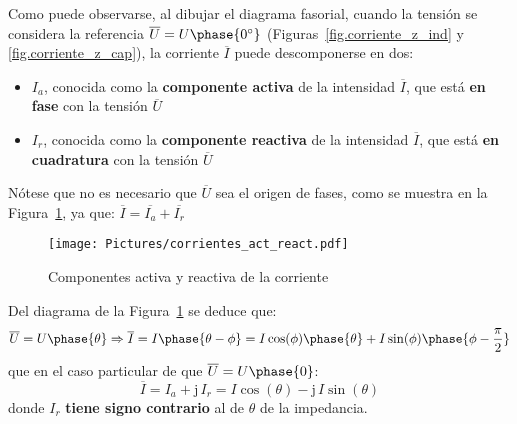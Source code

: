 \documentclass[11pt]{book} %
\numberwithin{dummy}{section}
\theoremstyle{ocrenumbox}
\theoremstyle{blacknumex}
\theoremstyle{blacknumbox}
\theoremstyle{ocrenum}
\newenvironment{remark}{\par\vspace{10pt}\small %
\begin{list}{}{
\leftmargin=35pt %
\rightmargin=25pt}\item\ignorespaces %
\makebox[-2.5pt]{\begin{tikzpicture}[overlay]
\node[draw=ocre!60,line width=1pt,circle,fill=ocre!25,font=\sffamily\bfseries,inner sep=2pt,outer sep=0pt] at (-15pt,0pt){\textcolor{ocre}{N}};\end{tikzpicture}} %
\advance\baselineskip -1pt}{\end{list}\vskip5pt} %
\newlength\esp
\begin{document}
	Como puede observarse, al dibujar el diagrama fasorial, cuando la tensión se considera la referencia $\overline{U}=U\phase{0^\circ}$ (Figuras~\ref{fig.corriente_z_ind} y \ref{fig.corriente_z_cap}), la corriente $\overline{I}$ puede descomponerse en dos:
	\begin{itemize}
		\item $I_a$, conocida como la  \textbf{componente activa} de la intensidad $\overline{I}$, que está \textbf{en fase} con la tensión $\overline{U}$
		\item $I_r$, conocida como la \textbf{componente reactiva} de la intensidad $\overline{I}$, que está \textbf{en cuadratura} con la tensión $\overline{U}$
	\end{itemize}
	
	\begin{remark}
		Nótese que no es necesario que $\overline{U}$ sea el origen de fases, como se muestra en la Figura~\ref{fig.corrientes_act_react}, ya que: $\overline{I}=\overline{I_a}+\overline{I_r}$
	\end{remark}
	
	\begin{figure}[htbp]
		\centering
		\texttt{[image: Pictures/corrientes\_act\_react.pdf]}
		\caption{Componentes activa y reactiva de la corriente}
		\label{fig.corrientes_act_react}
	\end{figure}
	
	Del diagrama de la Figura~\ref{fig.corrientes_act_react} se deduce que: 
	\begin{equation*}
		\overline{U}=U\phase{\theta}\Rightarrow \overline{I}=I\phase{\theta-\phi}=I\cos(\phi)\phase{\theta}+I\sin(\phi)\phase{\phi-\frac{\pi}{2}}
	\end{equation*}
	que en el caso particular de que $\overline{U}=U\phase{0}$:
	\begin{equation*}
		\overline{I}=I_a+\mathrm{j}\,I_r=I\cos(\theta)-\mathrm{j}\,I\sin(\theta)
	\end{equation*}
	donde $I_r$ \textbf{tiene signo contrario} al de $\theta$ de la impedancia.
	
\end{document}
